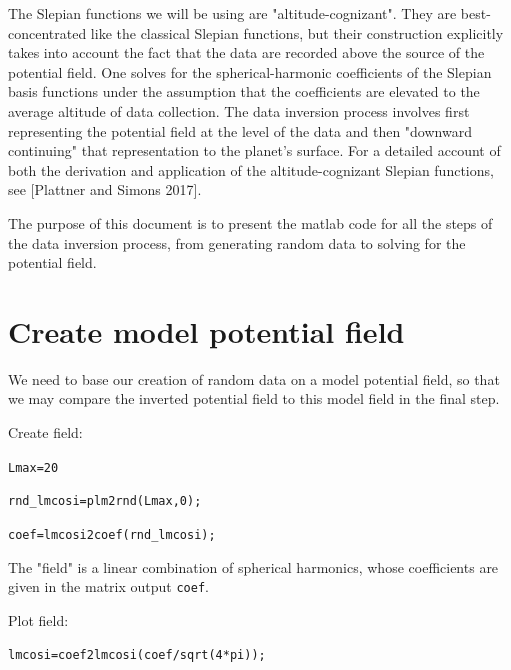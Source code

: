 \documentclass{article}
\begin{document}
The Slepian functions we will be using are "altitude-cognizant". They are best-concentrated like the classical Slepian functions, but their construction explicitly takes into account the fact that the data are recorded above the source of the potential field. One solves for the spherical-harmonic coefficients of the Slepian basis functions under the assumption that the coefficients are elevated to the average altitude of data collection. The data inversion process involves first representing the potential field at the level of the data and then "downward continuing" that representation to the planet's surface. For a detailed account of both the derivation and application of the altitude-cognizant Slepian functions, see [Plattner and Simons 2017]. 

The purpose of this document is to present the matlab code for all the steps of the data inversion process, from generating random data to solving for the potential field.

\section{Create model potential field}

We need to base our creation of random data on a model potential field, so that we may compare the inverted potential field to this model field in the final step.

\vspace{3mm}

\setlength{\parskip}{.1mm}

Create field:

\vspace{3mm}

\verb!Lmax=20 !

\verb!rnd_lmcosi=plm2rnd(Lmax,0);!

\verb!coef=lmcosi2coef(rnd_lmcosi);!

\setlength{\parskip}{0.5cm plus4mm minus3mm}

The "field" is a linear combination of spherical harmonics, whose coefficients are given in the matrix output \verb!coef!.

\vspace{3mm}

\setlength{\parskip}{.1mm}

Plot field:

\vspace{3mm}

\verb!lmcosi=coef2lmcosi(coef/sqrt(4*pi));!
\end{document}
